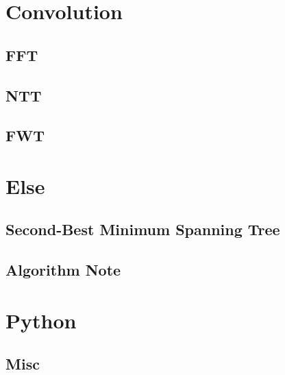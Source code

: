 \section{Convolution}
\subsection{FFT}

\subsection{NTT}

\subsection{FWT}


\section{Else}
\subsection{Second-Best Minimum Spanning Tree}

\subsection{Algorithm Note}

\section{Python}
\subsection{Misc}

